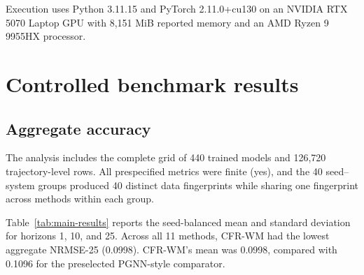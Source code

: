 \documentclass[iicol,pdflatex,sn-basic,Numbered]{sn-jnl}
\newcommand{\CFRNRMSE}{0.0998}
\newcommand{\PGNNNRMSE}{0.1096}
\newcommand{\BestMethod}{CFR-WM}
\newcommand{\BestNRMSE}{0.0998}
\newcommand{\AllMetricsFinite}{yes}
\newcommand{\UniqueDataHashes}{40}
\newcommand{\ConfirmatoryRuns}{440}
\newcommand{\ConfirmatoryTrajectories}{126{,}720}
\begin{document}
Execution uses Python 3.11.15 and PyTorch 2.11.0+cu130 on an NVIDIA RTX 5070
Laptop GPU with 8,151 MiB reported memory and an AMD Ryzen 9 9955HX processor.

\section{Controlled benchmark results}

\subsection{Aggregate accuracy}

The analysis includes the complete grid of \ConfirmatoryRuns{}
trained models and \ConfirmatoryTrajectories{} trajectory-level rows. All
prespecified metrics were finite (\AllMetricsFinite), and the 40 seed--system
groups produced \UniqueDataHashes{} distinct data fingerprints while sharing
one fingerprint across methods within each group.

Table~\ref{tab:main-results} reports the seed-balanced mean and standard
deviation for horizons 1, 10, and 25. Across all 11 methods, \BestMethod{}
had the lowest aggregate NRMSE-25 (\BestNRMSE). CFR-WM's mean was
\CFRNRMSE{}, compared with \PGNNNRMSE{} for the preselected PGNN-style comparator.
\end{document}
